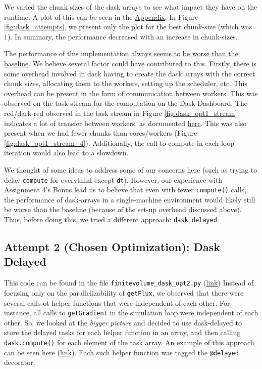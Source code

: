 \documentclass[a4paper,10pt]{article}
\begin{document}
We varied the chunk sizes of the dask arrays to see what impact they have on the runtime.
A plot of this can be seen in the \hyperref[fig:dask_opt1_chunk_size]{Appendix}.
In Figure \ref{fig:dask_attempts}, we present only the plot for the best chunk-size (which was 1).
In summary, the performance decreased with an increase in chunk-sizes.

The performance of this implementation \underline{always seems to be worse than the baseline}.
We believe several factor could have contributed to this.
Firstly, there is some overhead involved in dask having to create the dask arrays with the correct chunk sizes, allocating them to the workers, setting up the scheduler, etc.
This overhead can be present in the form of communication between workers.
This was observed on the task-stream for the computation on the Dask Dashboard.
The red/dark-red observed in the task stream in Figure \ref{fig:dask_opt1_stream} indicates a lot of transfer between workers, as documented \href{https://docs.dask.org/en/stable/dashboard.html\#task-stream}{here}.
This was also present when we had fewer chunks than cores/workers (Figure \ref{fig:dask_opt1_stream_4}).
Additionally, the call to compute in each loop iteration would also lead to a slowdown.

We thought of some ideas to address some of our concerns here (such as trying to delay \verb|compute| for everythinf except \verb|dt|).
However, our experience with Assignment 4's Bonus lead us to believe that even with fewer \verb|compute()| calls, the performance of dask-arrays in a single-machine environment would likely still be worse than the baseline (because of the set-up overhead discussed above).
Thus, before doing this, we tried a different approach: \verb|dask delayed|.

\subsection{Attempt 2 (Chosen Optimization): Dask Delayed}
This code can be found in the file \verb|finitevolume_dask_opt2.py| (\href{https://github.com/paulmyr/DD2358-HPC25/blob/master/10_project_rishi_paul/code/dask/finitevolume_dask_opt1.py}{link}) Instead of focusing only on the parallelizability of \verb|getFlux|, we observed that there were several calls ot helper functions that were independent of each other.
For instance, all calls to \verb|getGradient| in the simulation loop were independent of each other.
So, we looked at the \textit{bigger picture} and decided to use dask-delayed to store the delayed tasks for each helper function in an array, and then calling \verb|dask.compute()| for each element of the task array.
An example of this approach can be seen here (\href{https://github.com/paulmyr/DD2358-HPC25/blob/master/10_project_rishi_paul/code/dask/finitevolume_dask_opt2.py\#L273}{link}).
Each such helper function was tagged the \verb|@delayed| decorator.
\end{document}
